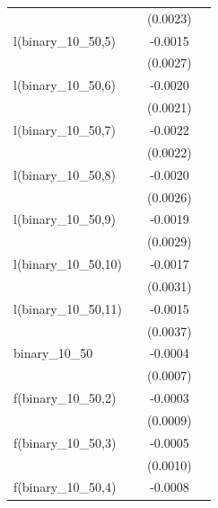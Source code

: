 \begin{tabular}{lccc}
                                    &          & (0.0023)              &   \\   
   l(binary\_10\_50,5)              &          & -0.0015               &   \\   
                                    &          & (0.0027)              &   \\   
   l(binary\_10\_50,6)              &          & -0.0020               &   \\   
                                    &          & (0.0021)              &   \\   
   l(binary\_10\_50,7)              &          & -0.0022               &   \\   
                                    &          & (0.0022)              &   \\   
   l(binary\_10\_50,8)              &          & -0.0020               &   \\   
                                    &          & (0.0026)              &   \\   
   l(binary\_10\_50,9)              &          & -0.0019               &   \\   
                                    &          & (0.0029)              &   \\   
   l(binary\_10\_50,10)             &          & -0.0017               &   \\   
                                    &          & (0.0031)              &   \\   
   l(binary\_10\_50,11)             &          & -0.0015               &   \\   
                                    &          & (0.0037)              &   \\   
   binary\_10\_50                   &          & -0.0004               &   \\   
                                    &          & (0.0007)              &   \\   
   f(binary\_10\_50,2)              &          & -0.0003               &   \\   
                                    &          & (0.0009)              &   \\   
   f(binary\_10\_50,3)              &          & -0.0005               &   \\   
                                    &          & (0.0010)              &   \\   
   f(binary\_10\_50,4)              &          & -0.0008               &   \\   

\end{tabular}

